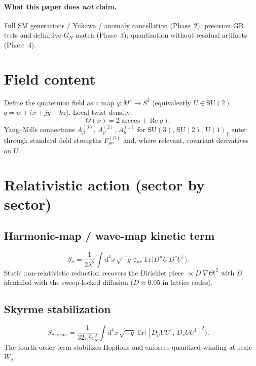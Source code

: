 \documentclass[11pt]{article}
\begin{document}
\paragraph{What this paper does \emph{not} claim.}
Full SM generations / Yukawa / anomaly cancellation (Phase~2); precision GR tests and
definitive $G_N$ match (Phase~3); quantization without residual artifacts (Phase~4).

\section{Field content}

Define the quaternion field as a map $q:M^4\to S^3$ (equivalently $U\in\mathrm{SU}(2)$,
$q=w+ix+jy+kz$). Local twist density:
\begin{equation}
\Theta(x)=2\arccos(\operatorname{Re} q).
\label{eq:theta}
\end{equation}
Yang--Mills connections $A_\mu^{(3)}$, $A_\mu^{(2)}$, $A_\mu^{(1)}$ for
$\mathrm{SU}(3)$, $\mathrm{SU}(2)$, $\mathrm{U}(1)_Y$ enter through standard field
strengths $F_{\mu\nu}^{(G)}$ and, where relevant, covariant derivatives on $U$.

\section{Relativistic action (sector by sector)}

\subsection{Harmonic-map / wave-map kinetic term}
\begin{equation}
S_\sigma
=\frac{1}{2\lambda^2}\int\mathrm{d}^4x\,\sqrt{-g}\,
\varepsilon_{\mu\nu}\,\mathrm{Tr}\!\bigl(D^\mu U\,D^\nu U^\dagger\bigr).
\label{eq:sigma}
\end{equation}
Static non-relativistic reduction recovers the Dirichlet piece $\propto D|\nabla\Theta|^2$
with $D$ identified with the sweep-locked diffusion ($D\approx 0.05$ in lattice codes).

\subsection{Skyrme stabilization}
\begin{equation}
S_{\mathrm{Skyrme}}
=\frac{1}{32\pi^2 e_S^2}\int\mathrm{d}^4x\,\sqrt{-g}\,
\mathrm{Tr}\!\bigl([D_\mu U U^\dagger,\,D_\nu U U^\dagger]^2\bigr).
\label{eq:skyrme}
\end{equation}
The fourth-order term stabilizes Hopfions and enforces quantized winding at scale $W_g$.
\end{document}
